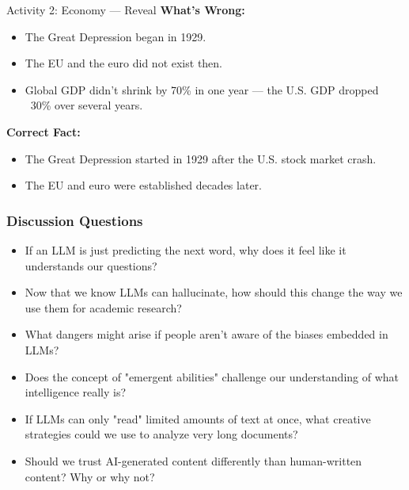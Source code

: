 \documentclass{beamer}
\begin{document}
\begin{frame}{Activity 2: Economy — Reveal}
    	\textbf{What’s Wrong:}
    \begin{itemize}
        \item The Great Depression began in 1929.
        \item The EU and the euro did not exist then.
        \item Global GDP didn’t shrink by 70\% in one year — the U.S. GDP dropped ~30\% over several years.
    \end{itemize}
    	\textbf{Correct Fact:}
    \begin{itemize}
        \item The Great Depression started in 1929 after the U.S. stock market crash.
        \item The EU and euro were established decades later.
    \end{itemize}
\end{frame}


\begin{frame}
    \frametitle{Discussion Questions}
    \begin{itemize}
        \item If an LLM is just predicting the next word, why does it feel like it understands our questions?
        \item Now that we know LLMs can hallucinate, how should this change the way we use them for academic research?
        \item What dangers might arise if people aren't aware of the biases embedded in LLMs?
        \item Does the concept of "emergent abilities" challenge our understanding of what intelligence really is?
        \item If LLMs can only "read" limited amounts of text at once, what creative strategies could we use to analyze very long documents?
        \item Should we trust AI-generated content differently than human-written content? Why or why not?
    \end{itemize}
\end{frame}
\end{document}
